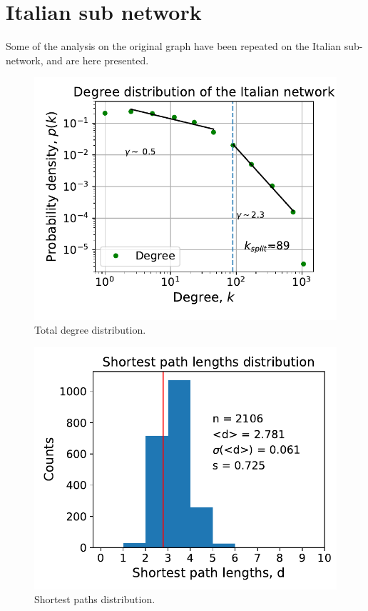 \documentclass[11pt, twoside]{report}
\begin{document}
\section{Italian sub network}
Some of the analysis on the original graph have been repeated on the Italian sub-network, and are here presented.
\begin{minipage}[b]{0.5\textwidth}
   \centering
    \begin{figure}[H]
      \includegraphics[width=\textwidth]{../../scripts/network_analysis/imgs/tot_degree_distribution_ita.pdf}            
          \caption{Total degree distribution.}
      \label{fig:tot_degree_ita}
\end{figure}
\end{minipage}
\begin{minipage}[b]{0.5\textwidth}
  \begin{figure}[H]
  \centering
      \includegraphics[width=\textwidth]{../../scripts/network_analysis/imgs/paths_hist_ita.pdf}            
        \caption{Shortest paths distribution.}
\end{figure}
\end{minipage}
\end{document}
